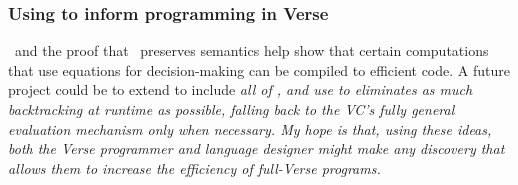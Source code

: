 \documentclass[manuscript,screen,review, 12pt, nonacm]{acmart}
\begin{document}

        \subsubsection{Using \VMinus to inform programming in Verse}
        \label{vminusandvc}
        
        
        

        
        \DTran\ and the proof that \DTran\ preserves semantics help show that
        certain computations that use equations for decision-making can be
        compiled to efficient code. A future project could be to extend \VMinus
        to include \it{all} of \VC, and use \DTran to eliminates as much
        backtracking at runtime as possible, falling back to the VC's fully
        general evaluation mechanism only when necessary. My hope is that, using
        these ideas, both the Verse programmer and language designer might make
        any discovery that allows them to increase the efficiency of full-Verse
        programs. 
\end{document}
